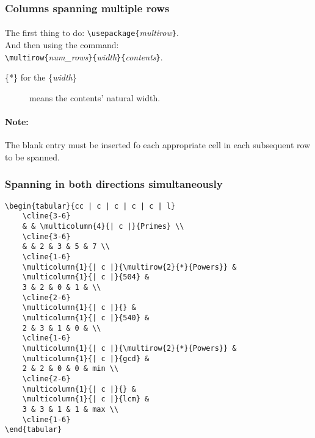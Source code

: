 \documentclass[11pt,a4paper]{article}
\begin{document}
\subsubsection{Columns spanning multiple rows}

\paragraph{}
The first thing to do: \verb|\usepackage{|\emph{multirow}\verb|}|.\\
And then using the command:\\ \verb|\multirow{|\emph{num\_rows}\verb|}{|\emph{width}\verb|}{|\emph{contents}\verb|}|.
\begin{description}
	\item[\{*\} for the \{\emph{width}\}] means the contents' natural width.
\end{description}

\paragraph{Note:} The blank entry must be inserted fo each appropriate cell in each subsequent row to be spanned.

\subsubsection{Spanning in both directions simultaneously}
\begin{verbatim}
\begin{tabular}{cc | c | c | c | c | l}
	\cline{3-6}
	& & \multicolumn{4}{| c |}{Primes} \\
	\cline{3-6}
	& & 2 & 3 & 5 & 7 \\
	\cline{1-6}
	\multicolumn{1}{| c |}{\multirow{2}{*}{Powers}} &
	\multicolumn{1}{| c |}{504} &
	3 & 2 & 0 & 1 & \\
	\cline{2-6}
	\multicolumn{1}{| c |}{} &
	\multicolumn{1}{| c |}{540} &
	2 & 3 & 1 & 0 & \\
	\cline{1-6}
	\multicolumn{1}{| c |}{\multirow{2}{*}{Powers}} &
	\multicolumn{1}{| c |}{gcd} &
	2 & 2 & 0 & 0 & min \\
	\cline{2-6}
	\multicolumn{1}{| c |}{} &
	\multicolumn{1}{| c |}{lcm} &
	3 & 3 & 1 & 1 & max \\
	\cline{1-6}
\end{tabular}
\end{verbatim}
\end{document}
